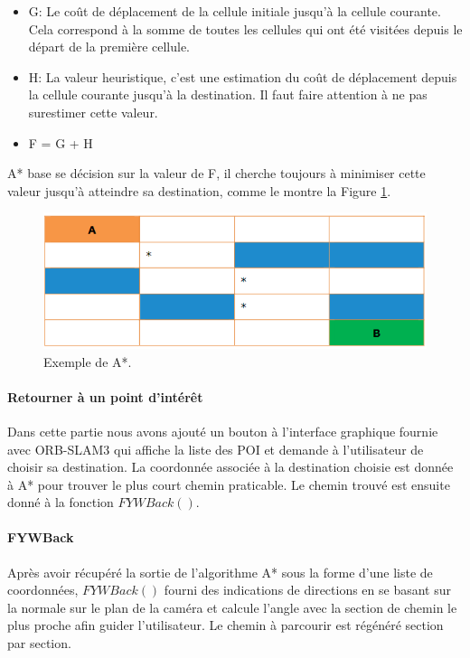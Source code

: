 \documentclass[11pt]{article}
\begin{document}
          \begin{itemize}
            \item G: Le coût de déplacement de la cellule initiale jusqu'à la cellule courante. Cela correspond à la somme de toutes les 
            cellules qui ont été visitées depuis le départ de la première cellule.
            \item H: La valeur heuristique, c'est une estimation du coût de déplacement depuis la cellule courante jusqu'à la destination. 
            Il faut faire attention à ne pas surestimer cette valeur.
            \item F = G + H            
          \end{itemize} 
          A* base se décision sur la valeur de F, il cherche toujours à minimiser cette valeur jusqu'à atteindre sa destination,
          comme le montre la Figure \ref{fig:Astar}.          
          
          \begin{figure}[hbt]  
            \includegraphics[width=\textwidth]{Astar.png}    
            \caption{Exemple de A*.}
            \label{fig:Astar}
          \end{figure} 


        \paragraph{Retourner à un point d'intérêt}
          Dans cette partie nous avons ajouté un bouton à l'interface graphique fournie avec ORB-SLAM3 qui affiche la liste des POI et 
          demande à l'utilisateur de choisir sa destination. La coordonnée associée à la destination choisie est donnée à A* pour trouver
          le plus court chemin praticable. Le chemin trouvé est ensuite donné à la fonction $FYWBack()$.          

        \paragraph{FYWBack}
            Après avoir récupéré la sortie de l'algorithme A* sous la forme d'une liste de coordonnées, $FYWBack()$ fourni des indications
            de directions en se basant sur la normale sur le plan de la caméra et calcule l'angle avec la section de chemin le plus proche
            afin guider l'utilisateur. Le chemin à parcourir est régénéré section par section.            
      
\end{document}
